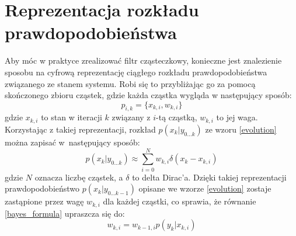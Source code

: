 \section{Reprezentacja rozkładu prawdopodobieństwa}
Aby móc w praktyce zrealizować filtr cząsteczkowy, konieczne jest znalezienie sposobu na cyfrową reprezentację ciągłego rozkładu prawdopodobieństwa związanego ze stanem systemu. Robi się to przybliżając go za pomocą skończonego zbioru cząstek, gdzie każda cząstka wygląda w następujący sposób:
\begin{equation*}
	p_{i,k}=\{x_{k,i},w_{k,i}\}
\end{equation*}
gdzie $x_{k,i}$ to stan w iteracji $k$ związany z $i$-tą cząstką, $w_{k,i}$ to jej waga. Korzystając z takiej reprezentacji, rozkład $p(x_k|y_{0...k})$ ze wzoru \ref{evolution} można zapisać w~następujący sposób:
\begin{equation}
	p(x_k|y_{0...k})\approx \sum_{i=0}^{N} w_{k,i}	\delta(x_k-x_{k,i})
\end{equation}
gdzie $N$ oznacza liczbę cząstek, a $\delta$ to delta Dirac'a. Dzięki takiej reprezentacji prawdopodobieństwo $p(x_k|y_{0...k-1})$ opisane we wzorze \ref{evolution} zostaje zastąpione przez wagę $w_{k,i}$ dla każdej cząstki, co sprawia, że równanie \ref{bayes_formula} upraszcza się do:
\begin{equation}\label{weight_update}
	w_{k,i} = w_{k-1,i} p(y_k|x_{k,i})
\end{equation}


